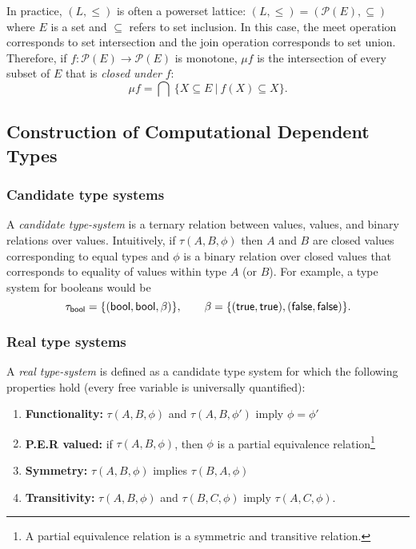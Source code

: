 \documentclass{article} \usepackage{chtt-notes} \usepackage{stmaryrd}
\begin{document}
In practice, $(L, \leq)$ is often a powerset lattice:
$(L, \leq) = (\mathcal{P}(E), \subseteq)$ where $E$ is a set and
$\subseteq$ refers to set inclusion. In this case, the meet operation
corresponds to set intersection and the join operation corresponds to
set union. Therefore, if $f : \mathcal{P}(E) \to \mathcal{P}(E)$ is
monotone, $\mu f$ is the intersection of every subset of $E$ that is
\emph{closed under} $f$:
\[ \mu f = \bigcap \ \{ X \subseteq E \ | \ f(X) \subseteq X \}. \]


\subsection{Construction of Computational Dependent Types}

\subsubsection{Candidate type systems}

A \emph{candidate type-system} is a ternary relation between values,
values, and binary relations over values.  Intuitively, if
$\tau(A, B, \phi)$ then $A$ and $B$ are closed values corresponding to
equal types and $\phi$ is a binary relation over closed values that
corresponds to equality of values within type $A$ (or $B$).  For
example, a type system for booleans would be
\[\tau_{\mathsf{bool}} = \{(\mathsf{bool}, \mathsf{bool}, \beta)\}, \qquad
  \beta = \{(\mathsf{true}, \mathsf{true}), (\mathsf{false}, \mathsf{false})\}.\]

\subsubsection{Real type systems}
A \emph{real type-system} is defined as a candidate type system for
which the following properties hold (every free variable is
universally quantified):
\begin{enumerate}
\item \textbf{Functionality:} $\tau(A, B, \phi)$ and
  $\tau(A, B, \phi')$ imply $\phi = \phi'$
\item \textbf{\textsc{P.E.R} valued:} if $\tau(A, B, \phi)$, then
  $\phi$ is a partial equivalence relation\footnote{A partial
    equivalence relation is a symmetric and transitive relation.}
\item \textbf{Symmetry:} $\tau(A, B, \phi)$ implies $\tau(B, A, \phi)$
\item \textbf{Transitivity:} $\tau(A, B, \phi)$ and $\tau(B, C, \phi)$
  imply $\tau(A, C, \phi)$.
\end{enumerate}
\end{document}
